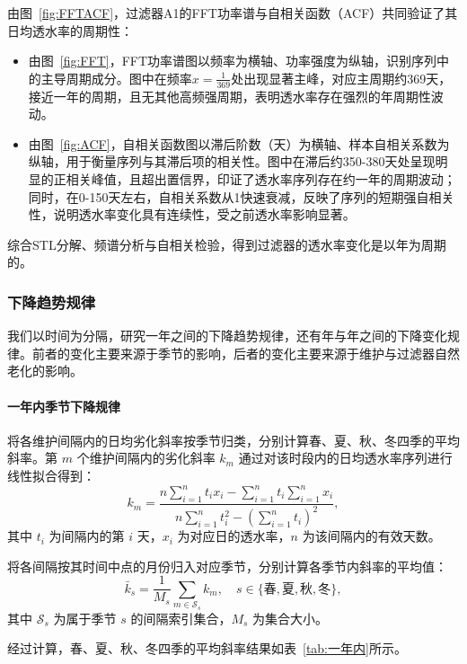 \documentclass[withoutpreface,bwprint]{cumcmthesis}
\begin{document}
由图~\ref{fig:FFTACF}，过滤器A1的FFT功率谱与自相关函数（ACF）共同验证了其日均透水率的周期性：
\begin{itemize}
	\item 由图~\ref{fig:FFT}，FFT功率谱图以频率为横轴、功率强度为纵轴，识别序列中的主导周期成分。图中在频率$x=\frac{1}{369}$处出现显著主峰，对应主周期约369天，接近一年的周期，且无其他高频强周期，表明透水率存在强烈的年周期性波动。
	\item 由图~\ref{fig:ACF}，自相关函数图以滞后阶数（天）为横轴、样本自相关系数为纵轴，用于衡量序列与其滞后项的相关性。图中在滞后约350-380天处呈现明显的正相关峰值，且超出置信界，印证了透水率序列存在约一年的周期波动；同时，在0-150天左右，自相关系数从1快速衰减，反映了序列的短期强自相关性，说明透水率变化具有连续性，受之前透水率影响显著。
\end{itemize}

综合STL分解、频谱分析与自相关检验，得到过滤器的透水率变化是以年为周期的。


\subsubsection{下降趋势规律}
我们以时间为分隔，研究一年之间的下降趋势规律，还有年与年之间的下降变化规律。前者的变化主要来源于季节的影响，后者的变化主要来源于维护与过滤器自然老化的影响。
\paragraph{一年内季节下降规律}

将各维护间隔内的日均劣化斜率按季节归类，分别计算春、夏、秋、冬四季的平均斜率。第 $m$ 个维护间隔内的劣化斜率 $k_m$ 通过对该时段内的日均透水率序列进行线性拟合得到：
\begin{equation}
	k_m = \frac{n \sum_{i=1}^{n} t_i x_i - \sum_{i=1}^{n} t_i \sum_{i=1}^{n} x_i}{n \sum_{i=1}^{n} t_i^2 - \left( \sum_{i=1}^{n} t_i \right)^2},
\end{equation}
其中 $t_i$ 为间隔内的第 $i$ 天，$x_i$ 为对应日的透水率，$n$ 为该间隔内的有效天数。

将各间隔按其时间中点的月份归入对应季节，分别计算各季节内斜率的平均值：
\begin{equation}
	\bar{k}_s = \frac{1}{M_s} \sum_{m \in \mathcal{S}_s} k_m, \quad s \in \{\text{春},\text{夏},\text{秋},\text{冬}\},
	\label{eq:ksbar}
\end{equation}
其中 $\mathcal{S}_s$ 为属于季节 $s$ 的间隔索引集合，$M_s$ 为集合大小。

经过计算，春、夏、秋、冬四季的平均斜率结果如表~\ref{tab:一年内}所示。
\end{document}
